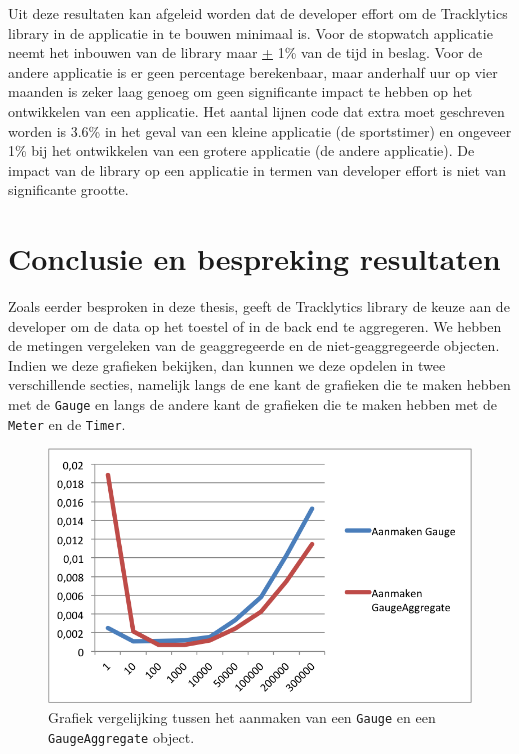 Uit deze resultaten kan afgeleid worden dat de developer effort om de Tracklytics library in de applicatie in te bouwen minimaal is. Voor de stopwatch applicatie neemt het inbouwen van de library maar \underline{+} 1\% van de tijd in beslag. Voor de andere applicatie is er geen percentage berekenbaar, maar anderhalf uur op vier maanden is zeker laag genoeg om geen significante impact te hebben op het ontwikkelen van een applicatie. Het aantal lijnen code dat extra moet geschreven worden is 3.6\% in het geval van een kleine applicatie (de sportstimer) en ongeveer 1\% bij het ontwikkelen van een grotere applicatie (de andere applicatie). De impact van de library op een applicatie in termen van developer effort is niet van significante grootte.\\




\section{Conclusie en bespreking resultaten}\label{Section:Conclusie}
Zoals eerder besproken in deze thesis, geeft de Tracklytics library de keuze aan de developer om de data op het toestel of in de back end te aggregeren. We hebben de metingen vergeleken van de geaggregeerde en de niet-geaggregeerde objecten. Indien we deze grafieken bekijken, dan kunnen we deze opdelen in twee verschillende secties, namelijk langs de ene kant de grafieken die te maken hebben met de \texttt{Gauge} en langs de andere kant de grafieken die te maken hebben met de \texttt{Meter} en de \texttt{Timer}. \\


\begin{figure}[h]
  \centering
  \includegraphics[scale=1.0]{Afbeeldingen/Evaluatie/GaugeVSAggregate}
  \caption{Grafiek vergelijking tussen het aanmaken van een \texttt{Gauge} en een \texttt{GaugeAggregate} object.}
  \label{fig:GaugeVSAggregate}
\end{figure}


